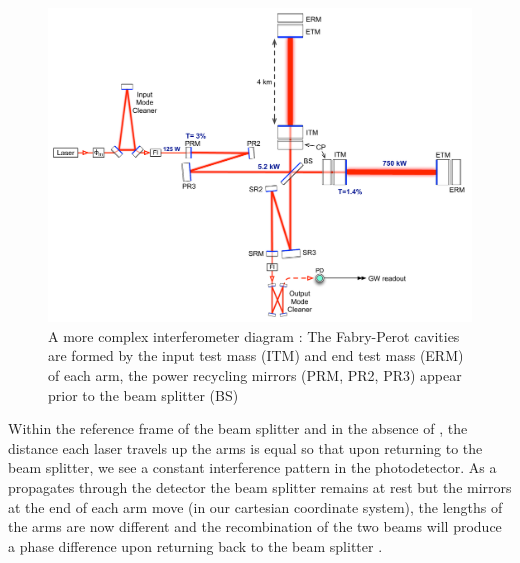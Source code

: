 \begin{figure}
   \includegraphics[width=\textwidth]{images/1_general_relativity/IFOdiagram.pdf}
   \caption{\label{fig:IFO}A more complex interferometer diagram \cite{aLIGO:2015}: The Fabry-Perot cavities are formed by the input test mass (ITM) and end test mass (ERM) of each arm, the power recycling mirrors (PRM, PR2, PR3) appear prior to the beam splitter (BS)}
\end{figure}

Within the reference frame of the beam splitter and in the absence of \gws, the distance each laser travels up the arms is equal so that upon returning to the beam splitter, we see a constant interference pattern in the photodetector.
As a \gw propagates through the detector the beam splitter remains at rest but the mirrors at the end of each arm move (in our cartesian coordinate system), the lengths of the arms are now different and the recombination of the two beams will produce a phase difference upon returning back to the beam splitter \cite{thorne_lecture}.
